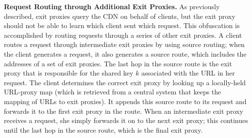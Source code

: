 \textbf{Request Routing through Additional Exit Proxies.}
As previously described, exit proxies query the CDN on behalf of clients, but the
exit proxy
should not be able to learn which client sent which request.  This obfuscation is
accomplished by routing requests through
a series of other exit proxies.  %
A client routes a request through
intermediate exit proxies by using source routing; when the client generates a request, it also
generates a source route, which includes
the addresses of a set of exit proxies.  The last hop in the source route is the exit proxy that is responsible for the 
shared key $k$ associated with the URL in her request.  The client determines the correct exit proxy by looking up a locally-held URL-proxy map (which is retrieved from a central system that keeps the mapping of URLs to exit proxies).  
It appends this source route to its request and forwards it to the first exit proxy
in the route.  When an intermediate exit proxy receives
a request, she simply forwards it on to the next exit proxy; this continues until the last hop in the source route, which 
is the final exit proxy. 


